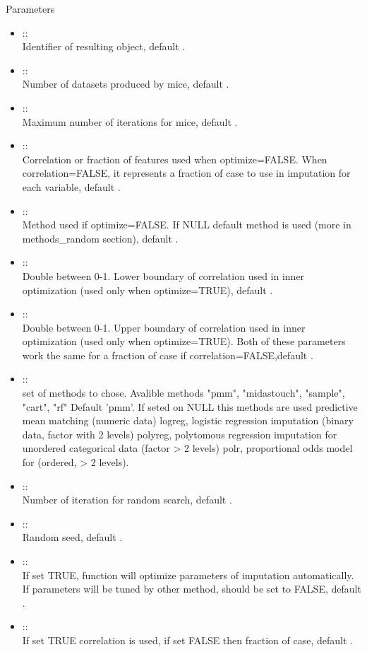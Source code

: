 \documentclass[letterpaper]{book}
\begin{document}
\begin{Section}{Parameters}
\begin{itemize}
\item{}  :: \\{}
Identifier of resulting object, default .
\item{}  :: \\{}
Number of datasets produced by mice, default .
\item{}  :: \\{}
Maximum number of iterations for mice, default .
\item{}  :: \\{}
Correlation or fraction of features used when optimize=FALSE. When correlation=FALSE, it represents a fraction of case to use in imputation for each variable, default .
\item{}  :: \\{}
Method used if optimize=FALSE. If NULL default method is used (more in methods\_random section), default .
\item{}  :: \\{}
Double between 0-1. Lower boundary of correlation used in inner optimization (used only when optimize=TRUE), default .
\item{}  :: \\{}
Double between 0-1. Upper boundary of correlation used in inner optimization (used only when optimize=TRUE). Both of these parameters work the same for a fraction of case if correlation=FALSE,default .
\item{}  :: \\{}
set of methods to chose. Avalible methods "pmm", "midastouch", "sample", "cart", "rf" Default 'pmm'. If seted on NULL this methods are used predictive mean matching (numeric data) logreg, logistic regression imputation (binary data, factor with 2 levels) polyreg, polytomous regression imputation for unordered categorical data (factor > 2 levels) polr, proportional odds model for (ordered, > 2 levels).
\item{}  :: \\{}
Number of iteration for random search, default .
\item{}  :: \\{}
Random seed, default .
\item{}  :: \\{}
If set TRUE, function will optimize parameters of imputation automatically. If parameters will be tuned by other method, should be set to FALSE, default .
\item{}  :: \\{}
If set TRUE correlation is used, if set FALSE then fraction of case, default .

\end{itemize}

\end{Section}
\end{document}
